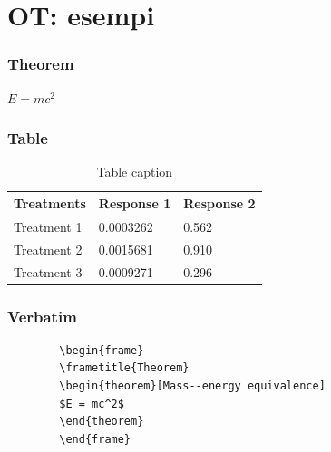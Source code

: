 \documentclass{beamer}
\begin{document}
\section{OT: esempi}








\begin{frame}
	\frametitle{Theorem}
	\begin{theorem}
		$E = mc^2$
	\end{theorem}
\end{frame}




\begin{frame}
	\frametitle{Table}
	\begin{table}
		\begin{tabular}{l l l}
			\toprule
			\textbf{Treatments} & \textbf{Response 1} & \textbf{Response 2}\\
			\midrule
			Treatment 1 & 0.0003262 & 0.562 \\
			Treatment 2 & 0.0015681 & 0.910 \\
			Treatment 3 & 0.0009271 & 0.296 \\
			\bottomrule
		\end{tabular}
		\caption{Table caption}
	\end{table}
\end{frame}




\begin{frame}[fragile] %
	\frametitle{Verbatim}
	\begin{example}
		\begin{verbatim}
		\begin{frame}
		\frametitle{Theorem}
		\begin{theorem}[Mass--energy equivalence]
		$E = mc^2$
		\end{theorem}
		\end{frame}\end{verbatim}
	\end{example}
\end{frame}
\end{document}
